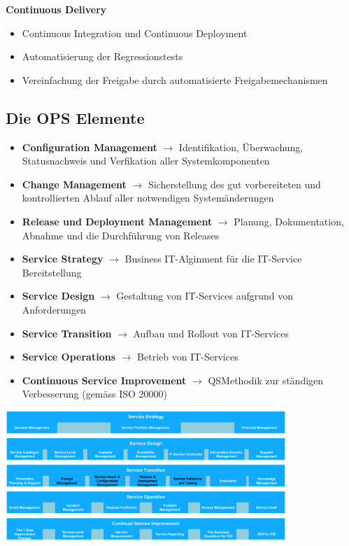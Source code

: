 \documentclass{report}
\newenvironment{Figure}
	{\par\medskip\noindent\minipage{\linewidth}}
	{\endminipage\par\medskip}
\theoremstyle{definition}
\theoremstyle{example}
\begin{document}
\textbf{Continuous Delivery}
\begin{itemize}
	\item Continuous Integration und Continuous Deployment
	\item Automatisierung der Regressionstests
	\item Vereinfachung der Freigabe durch automatisierte Freigabemechanismen
\end{itemize}

\subsection{Die OPS Elemente}

\begin{itemize}
	\item \textbf{Configuration Management} $\rightarrow$ Identifikation, Überwachung, Statusnachweis und Verfikation aller Systemkomponenten
	\item \textbf{Change Management} $\rightarrow$ Sicherstellung des gut vorbereiteten und kontrollierten Ablauf aller notwendigen Systemänderungen
	\item \textbf{Release und Deployment Management} $\rightarrow$ Planung, Dokumentation, Abnahme und die Durchführung von Releases
	\item \textbf{Service Strategy} $\rightarrow$ Business IT-Alginment für die IT-Service Bereitstellung
	\item \textbf{Service Design} $\rightarrow$ Gestaltung von IT-Services aufgrund von Anforderungen
	\item \textbf{Service Transition} $\rightarrow$ Aufbau und Rollout von IT-Services
	\item \textbf{Service Operations} $\rightarrow$ Betrieb von IT-Services
	\item \textbf{Continuous Service Improvement} $\rightarrow$ QSMethodik zur ständigen Verbesserung (gemäss ISO 20000)
\end{itemize}
\begin{Figure}
\centering
\includegraphics[width=400px]{img/ITILOps.png}
	\label{fig:OPS Elemente gemäss ITIL}
\end{Figure}
\end{document}
